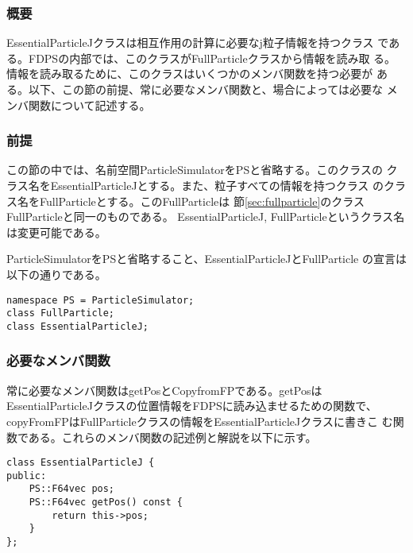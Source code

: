 \subsubsection{概要}

EssentialParticleJクラスは相互作用の計算に必要なj粒子情報を持つクラス
である。FDPSの内部では、このクラスがFullParticleクラスから情報を読み取
る。情報を読み取るために、このクラスはいくつかのメンバ関数を持つ必要が
ある。以下、この節の前提、常に必要なメンバ関数と、場合によっては必要な
メンバ関数について記述する。

\subsubsection{前提}

この節の中では、名前空間ParticleSimulatorをPSと省略する。このクラスの
クラス名をEssentialParticleJとする。また、粒子すべての情報を持つクラス
のクラス名をFullParticleとする。このFullParticleは
節\ref{sec:fullparticle}のクラスFullParticleと同一のものである。
EssentialParticleJ, FullParticleというクラス名は変更可能である。

ParticleSimulatorをPSと省略すること、EssentialParticleJとFullParticle
の宣言は以下の通りである。
\begin{screen}
\begin{verbatim}
namespace PS = ParticleSimulator;
class FullParticle;
class EssentialParticleJ;
\end{verbatim}
\end{screen}

\subsubsection{必要なメンバ関数}


常に必要なメンバ関数はgetPosとCopyfromFPである。getPosは
EssentialParticleJクラスの位置情報をFDPSに読み込ませるための関数で、
copyFromFPはFullParticleクラスの情報をEssentialParticleJクラスに書きこ
む関数である。これらのメンバ関数の記述例と解説を以下に示す。


\begin{screen}
\begin{verbatim}
class EssentialParticleJ {
public:
    PS::F64vec pos;
    PS::F64vec getPos() const {
        return this->pos;
    }
};
\end{verbatim}
\end{screen}

